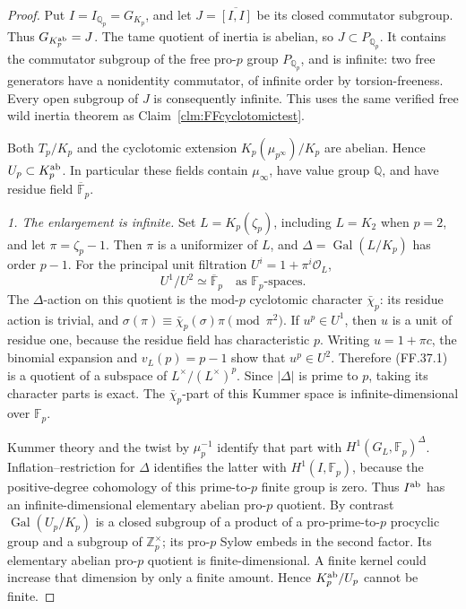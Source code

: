 \begin{proof}
Put \(I=I_{\mathbb Q_p}=G_{K_p}\), and
let \(J=\overline{[I,I]}\) be its closed
commutator subgroup. Thus
\(G_{K_p^{\rm ab}}=J\).
The tame quotient of inertia is abelian,
so \(J\subset P_{\mathbb Q_p}\).
It contains the commutator subgroup of
the free pro-\(p\) group
\(P_{\mathbb Q_p}\), and is infinite:
two free generators have a nonidentity
commutator, of infinite order by
torsion-freeness. Every open subgroup
of \(J\) is consequently infinite.
This uses the same verified free wild
inertia theorem as Claim~\ref{clm:FFcyclotomictest}.

Both \(T_p/K_p\) and the cyclotomic
extension \(K_p(\mu_{p^\infty})/K_p\)
are abelian. Hence \(U_p\subset K_p^{\rm ab}\).
In particular these fields contain
\(\mu_\infty\), have value group
\(\mathbb Q\), and have residue field
\(\overline{\mathbb F}_p\).

\emph{1. The enlargement is infinite.}
Set \(L=K_p(\zeta_p)\), including
\(L=K_2\) when \(p=2\), and let
\(\pi=\zeta_p-1\). Then \(\pi\) is
a uniformizer of \(L\), and
\(\Delta=\operatorname{Gal}(L/K_p)\)
has order \(p-1\). For the principal
unit filtration \(U^i=1+\pi^i\mathcal O_L\),
\[
                    U^1/U^2\simeq
                 \overline{\mathbb F}_p
                \quad\text{as }\mathbb F_p\text{-spaces}.
                                                        \tag{FF.37.1}
\]
The \(\Delta\)-action on this quotient
is the mod-\(p\) cyclotomic character
\(\bar\chi_p\): its residue action is
trivial, and
\(\sigma(\pi)\equiv\bar\chi_p(\sigma)\pi
\pmod{\pi^2}\).
If \(u^p\in U^1\), then \(u\) is a
unit of residue one, because the residue
field has characteristic \(p\). Writing
\(u=1+\pi c\), the binomial expansion
and \(v_L(p)=p-1\) show that
\(u^p\in U^2\). Therefore (FF.37.1)
is a quotient of a subspace of
\(L^\times/(L^\times)^p\).
Since \(|\Delta|\) is prime to \(p\),
taking its character parts is exact.
The \(\bar\chi_p\)-part of this Kummer
space is infinite-dimensional over
\(\mathbb F_p\).

Kummer theory and the twist by
\(\mu_p^{-1}\) identify that part
with \(H^1(G_L,\mathbb F_p)^\Delta\).
Inflation--restriction for \(\Delta\)
identifies the latter with
\(H^1(I,\mathbb F_p)\), because
the positive-degree cohomology of this
prime-to-\(p\) finite group is zero.
Thus \(I^{\rm ab}\) has an
infinite-dimensional elementary abelian
pro-\(p\) quotient. By contrast
\(\operatorname{Gal}(U_p/K_p)\)
is a closed subgroup of a product
of a pro-prime-to-\(p\) procyclic
group and a subgroup of
\(\mathbb Z_p^\times\); its pro-\(p\)
Sylow embeds in the second factor.
Its elementary abelian pro-\(p\)
quotient is finite-dimensional.
A finite kernel could increase that
dimension by only a finite amount.
Hence \(K_p^{\rm ab}/U_p\) cannot be finite.


\end{proof}
